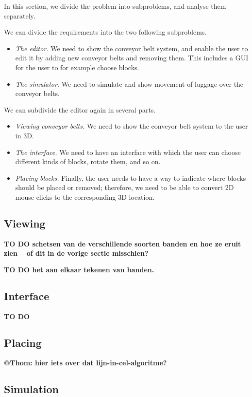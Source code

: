 In this section, we divide the problem into subproblems, and analyse them separately.

We can divide the requirements into the two following subproblems.
\begin{itemize}
 \item \emph{The editor.} We need to show the conveyor belt system, and enable the user to edit it by adding new conveyor belts and removing them. This includes a GUI for the user to for example choose blocks.
 \item \emph{The simulator.} We need to simulate and show movement of luggage over the conveyor belts.
\end{itemize}
We can subdivide the editor again in several parts.
\begin{itemize}
 \item \emph{Viewing conveyor belts.} We need to show the conveyor belt system to the user in 3D.
 \item \emph{The interface.} We need to have an interface with which the user can choose different kinds of blocks, rotate them, and so on.
 \item \emph{Placing blocks.} Finally, the user needs to have a way to indicate where blocks should be placed or removed; therefore, we need to be able to convert 2D mouse clicks to the corresponding 3D location.
\end{itemize}

\subsection{Viewing}
\textbf{TO DO schetsen van de verschillende soorten banden en hoe ze eruit zien -- of dit in de vorige sectie misschien?}

\textbf{TO DO het aan elkaar tekenen van banden.}

\subsection{Interface}
\textbf{TO DO}

\subsection{Placing}
\textbf{@Thom: hier iets over dat lijn-in-cel-algoritme?}

\subsection{Simulation}